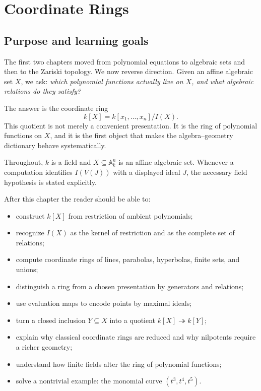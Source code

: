 %

\chapter{Coordinate Rings}
\label{ch:coordinate-rings}

\section*{Purpose and learning goals}

The first two chapters moved from polynomial equations to algebraic sets and then to the
Zariski topology.  We now reverse direction.  Given an affine algebraic set \(X\), we ask:
\emph{which polynomial functions actually live on \(X\), and what algebraic relations do
they satisfy?}

The answer is the coordinate ring
\[
  k[X]=k[x_1,\dots,x_n]/I(X).
\]
This quotient is not merely a convenient presentation.  It is the ring of polynomial
functions on \(X\), and it is the first object that makes the algebra--geometry dictionary
behave systematically.

Throughout, \(k\) is a field and \(X\subseteq\mathbb A_k^n\) is an affine algebraic set.
Whenever a computation identifies \(I(V(J))\) with a displayed ideal \(J\), the necessary
field hypothesis is stated explicitly.

After this chapter the reader should be able to:
\begin{itemize}
\item construct \(k[X]\) from restriction of ambient polynomials;
\item recognize \(I(X)\) as the kernel of restriction and as the complete set of relations;
\item compute coordinate rings of lines, parabolas, hyperbolas, finite sets, and unions;
\item distinguish a ring from a chosen presentation by generators and relations;
\item use evaluation maps to encode points by maximal ideals;
\item turn a closed inclusion \(Y\subseteq X\) into a quotient \(k[X]\twoheadrightarrow k[Y]\);
\item explain why classical coordinate rings are reduced and why nilpotents require a richer geometry;
\item understand how finite fields alter the ring of polynomial functions;
\item solve a nontrivial example: the monomial curve \((t^3,t^4,t^5)\).
\end{itemize}

